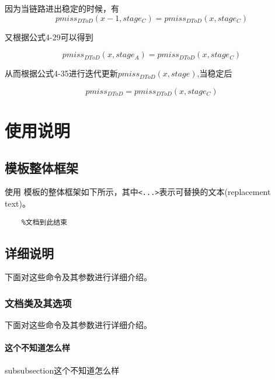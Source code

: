 \documentclass[figurelist,tablelist,algorithmlist,nomlist,masters]{seuthesix}
\begin{document}
因为当链路进出稳定的时候，有
\begin{equation}\label{eq3.1}
pmis{s_{DToD}}(x - 1,stag{e_C}) = pmis{s_{DToD}}(x,stag{e_C})
\end{equation}

又根据公式4-29可以得到

\begin{equation}\label{eq3.1}
pmis{s_{DToD}}(x,stag{e_A}) = pmis{s_{DToD}}(x,stag{e_C})
\end{equation}

从而根据公式4-35进行迭代更新$pmis{s_{DToD}}(x,stage)$,当稳定后

\begin{equation}\label{eq3.1}
pmis{s_{DToD}} = pmis{s_{DToD}}(x,stag{e_C})
\end{equation}



\chapter{使用说明}

\section{模板整体框架}
使用 \seuthesix 模板的整体框架如下所示，其中\verb+<...>+表示可替换的文本(replacement text)。
{\color{magenta}
	\begin{verbatim}
	%文档到此结束
	\end{verbatim}
}

\section{详细说明}
下面对这些命令及其参数进行详细介绍。
\subsection{文档类及其选项}
下面对这些命令及其参数进行详细介绍。
\subsubsection{这个不知道怎么样}
subsubsection{这个不知道怎么样}
\end{document}
